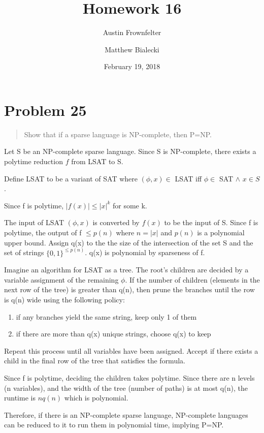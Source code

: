 \documentclass{article}
\title{Homework 16}
\author{Austin Frownfelter \and Matthew Bialecki}
\date{February 19, 2018}
\begin{document}
\maketitle

\section{Problem 25}
\begin{quote}
Show that if a sparse language is NP-complete, then P=NP.
\end{quote}

Let S be an NP-complete sparse language.  Since S is NP-complete, there exists a polytime reduction $f$ from LSAT to S.

Define LSAT to be a variant of SAT where $(\phi, x)\in$ LSAT iff $\phi \in$ SAT $\land$ $x\in S$.

Since f is polytime, $|f(x)| \leq |x|^k$ for some k.

The input of LSAT $(\phi, x)$ is converted by $f(x)$ to be the input of S.  Since f is polytime, the output of f $\leq p(n)$ where $n=|x|$ and $p(n)$ is a polynomial upper bound.  Assign q(x) to the the size of the intersection of the set S and the set of strings $\{0,1\}^{\leq p(n)}$.  q(x) is polynomial by sparseness of f.

Imagine an algorithm for LSAT as a tree.  The root's children are decided by a variable assignment of the remaining $\phi$.  If the number of children (elements in the next row of the tree) is greater than q(n), then prune the branches until the row is q(n) wide using the following policy:
\begin{enumerate}[label=]
\item if any branches yield the same string, keep only 1 of them
\item if there are more than q(x) unique strings, choose q(x) to keep
\end{enumerate}

Repeat this process until all variables have been assigned.  Accept if there exists a child in the final row of the tree that satisfies the formula. 

Since f is polytime, deciding the children takes polytime.  Since there are n levels (n variables), and the width of the tree (number of paths) is at most q(n), the runtime is $nq(n)$ which is polynomial.

\bigskip
Therefore, if there is an NP-complete sparse language, NP-complete languages can be reduced to it to run them in polynomial time, implying P=NP.
\end{document}
